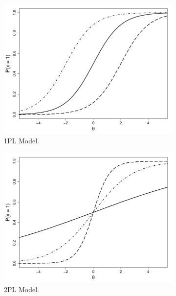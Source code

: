 \documentclass[12pt]{book}
\begin{document}
\begin{figure}[h!]
	\centering 
	\begin{subfigure}{0.45\linewidth}
		\includegraphics[width=\linewidth]{OnePL.pdf}
		\caption{1PL Model.}
		\label{subfig:1pl}
	\end{subfigure}
	\begin{subfigure}{0.45\linewidth}
		\includegraphics[width=\linewidth]{TwoPL.pdf}
		\caption{2PL Model.}
		\label{subfig:2pl}
	\end{subfigure}
	\begin{subfigure}{0.45\linewidth}

\end{subfigure}
\end{figure}
\end{document}
